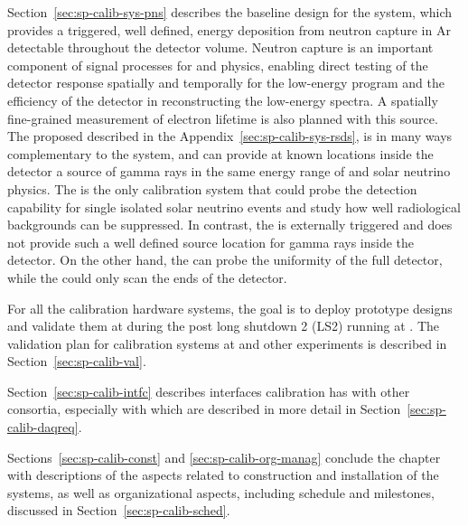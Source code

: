 Section~\ref{sec:sp-calib-sys-pns} describes the baseline design for the  system, which provides a triggered, well defined, energy deposition from neutron capture in Ar detectable throughout the detector volume. Neutron capture is an important component of signal processes for  and  physics, enabling direct testing of the detector response spatially and temporally for the low-energy program and the efficiency of the detector in reconstructing the low-energy spectra. A spatially fine-grained measurement of electron lifetime is also planned with this source.
The proposed  described in the Appendix~\ref{sec:sp-calib-sys-rsds}, 
is in many ways complementary to the 
system, and can provide at known locations inside the detector a source of gamma rays in the same energy range of  and solar neutrino physics. %
The  is the only calibration system that could probe the detection capability for single isolated solar neutrino events and study how well radiological backgrounds can be suppressed. In contrast, the  is externally triggered and does not provide such a well defined source location for gamma rays inside the detector. On the other hand, the  can probe the uniformity of the full detector, while the  could only scan the ends of the detector. %


For all the calibration hardware systems, the goal is to deploy prototype designs and validate them at  during the post long shutdown 2 (LS2) running  at . The validation plan for calibration systems at  and other experiments is described in Section~\ref{sec:sp-calib-val}. 

Section~\ref{sec:sp-calib-intfc} describes interfaces calibration has with other  consortia, especially  with  which are described in more detail in Section~\ref{sec:sp-calib-daqreq}. 

Sections~\ref{sec:sp-calib-const} and \ref{sec:sp-calib-org-manag} conclude the chapter with descriptions of the aspects related to construction and installation of the systems, as well as organizational aspects, including schedule and milestones, discussed in Section~\ref{sec:sp-calib-sched}.


